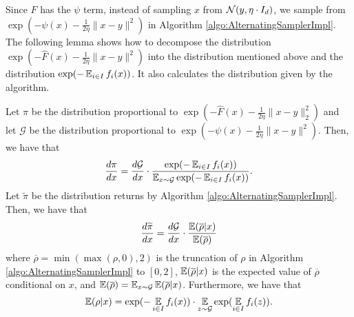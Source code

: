 Since $F$ has the $\psi$ term, instead of sampling $x$ from $\mathcal N(y,\eta\cdot I_{d})$,
we sample from $\exp(-\psi(x)-\frac{1}{2\eta}\|x-y\|^{2})$ in Algorithm
\ref{algo:AlternatingSamplerImpl}. The following lemma shows how
to decompose the distribution $\exp(-\widehat{F}(x)-\frac{1}{2\eta}\|x-y\|^{2})$
into the distribution mentioned above and the distribution $\exp(-\operatorname*{\mathbb{E}}_{i\in I}f_{i}(x))$. It
also calculates the distribution given by the algorithm. 
\begin{lem}
\label{lem:dpi}Let $\pi$ be the distribution proportional to $\exp(-\widehat{F}(x)-\frac{1}{2\eta}\|x-y\|_{2}^{2})$
and let $\mathcal{G}$ be the distribution proportional to $\exp(-\psi(x)-\frac{1}{2\eta}\|x-y\|^{2})$.
Then, we have that
\[
\frac{d\pi}{dx}=\frac{d\mathcal{G}}{dx}\cdot\frac{\exp(-\operatorname*{\mathbb{E}}_{i\in I}f_{i}(x))}{\operatorname*{\mathbb{E}}_{x\sim\mathcal{G}}\exp(-\operatorname*{\mathbb{E}}_{i\in I}f_{i}(x))}.
\]
Let $\widetilde{\pi}$ be the distribution returns by Algorithm \ref{algo:AlternatingSamplerImpl}.
Then, we have that
\[
\frac{d\widetilde{\pi}}{dx}=\frac{d\mathcal{G}}{dx}\cdot\frac{\operatorname*{\mathbb{E}}(\overline{\rho}|x)}{\operatorname*{\mathbb{E}}(\overline{\rho})}
\]
where $\overline{\rho} = \min(\max(\rho,0),2)$ is the truncation of $\rho$ in
Algorithm \ref{algo:AlternatingSamplerImpl} to $[0,2]$, $\operatorname*{\mathbb{E}}(\overline{\rho}|x)$ is the expected value of $\overline{\rho}$ conditional on $x$, and
$\operatorname*{\mathbb{E}}(\overline{\rho} )=\operatorname*{\mathbb{E}}_{x\sim\mathcal{G}}\operatorname*{\mathbb{E}}(\overline{\rho}|x)$. Furthermore,
we have that
\[
\operatorname*{\mathbb{E}}(\rho|x)=\exp(-\operatorname*{\mathbb{E}}_{i\in I}f_{i}(x))\cdot\operatorname*{\mathbb{E}}_{z\sim\mathcal{G}}\exp(\operatorname*{\mathbb{E}}_{i\in I}f_{i}(z)).
\]
\end{lem}

